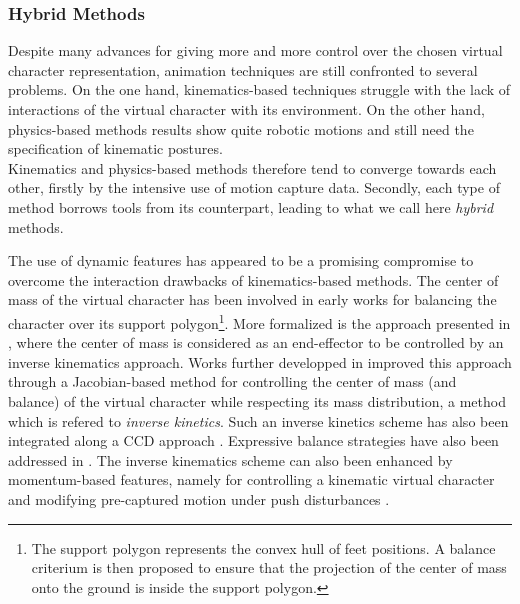 {{			\subsubsection{Hybrid Methods}
			\label{subsubsec:CA_MC_Hybrid}

Despite many advances for giving more and more control over the chosen virtual character representation, animation techniques are still confronted to several problems. On the one hand, kinematics-based techniques struggle with the lack of interactions of the virtual character with its environment. On the other hand, physics-based methods results show quite robotic motions and still need the specification of kinematic postures.\\

Kinematics and physics-based methods therefore tend to converge towards each other, firstly by the intensive use of motion capture data. Secondly, each type of method borrows tools from its counterpart, leading to what we call here \emph{hybrid} methods.


				\label{subsubsubsec:CA_MC_Hybrid_KinDyn}

The use of dynamic features has appeared to be a promising compromise to overcome the interaction drawbacks of kinematics-based methods. The center of mass of the virtual character has been involved in early works  for balancing the character over its support polygon\footnote{The support polygon represents the convex hull of feet positions. A balance criterium is then proposed to ensure that the projection of the center of mass onto the ground is inside the support polygon.}. More formalized is the approach presented in , where the center of mass is considered as an end-effector to be controlled by an inverse kinematics approach. Works further developped in  improved this approach through a Jacobian-based method for controlling the center of mass (and balance) of the virtual character while respecting its mass distribution, a method which is refered to \emph{inverse kinetics}. Such an inverse kinetics scheme has also been integrated along a CCD approach . Expressive balance strategies have also been addressed in . The inverse kinematics scheme can also been enhanced by momentum-based features, namely for controlling a kinematic virtual character and modifying pre-captured motion under push disturbances .


}}
